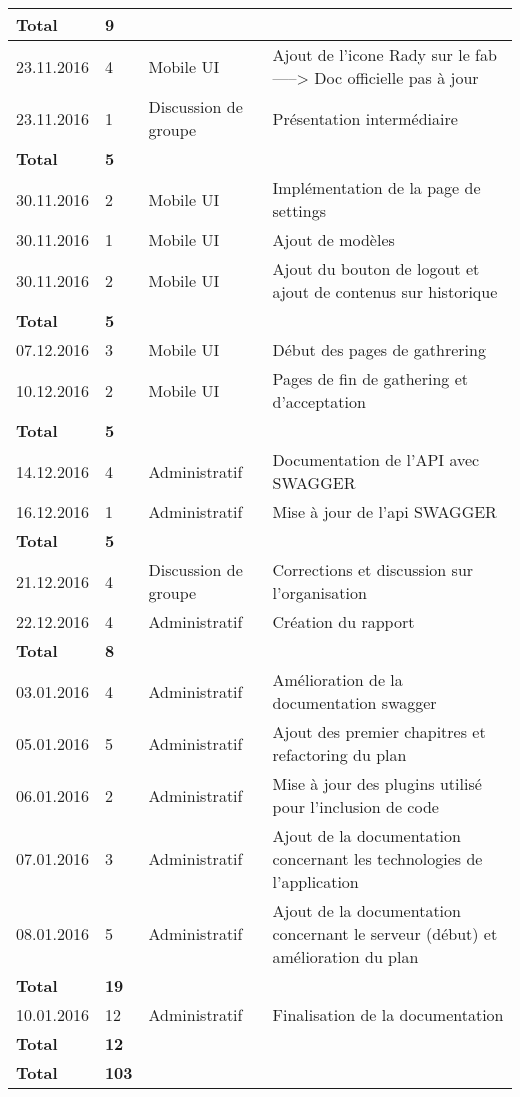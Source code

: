 \documentclass[french]{article}
\begin{document}
\begin{longtable}{p{}|p{}|p{}|p{}}
		\textbf{Total} & \textbf{9} &&\\
		\hline
		23.11.2016 & 4 & Mobile UI & Ajout de l'icone Rady sur le fab -----> Doc officielle pas à jour\\
		23.11.2016 & 1 & Discussion de groupe & Présentation intermédiaire\\
		\textbf{Total} & \textbf{5} &&\\
		\hline
		30.11.2016 & 2 & Mobile UI & Implémentation de la page de settings\\
		30.11.2016 & 1 & Mobile UI & Ajout de modèles\\
		30.11.2016 & 2 & Mobile UI & Ajout du bouton de logout et ajout de contenus sur historique\\
		\textbf{Total} & \textbf{5} &&\\
		\hline
		07.12.2016 & 3 & Mobile UI & Début des pages de gathrering\\
		10.12.2016 & 2 & Mobile UI & Pages de fin de gathering et d'acceptation\\
		\textbf{Total} & \textbf{5} &&\\
		\hline
		14.12.2016 & 4 & Administratif & Documentation de l'API avec SWAGGER\\
		16.12.2016 & 1 & Administratif & Mise à jour de l'api SWAGGER\\
		\textbf{Total} & \textbf{5} &&\\
		\hline
		21.12.2016 & 4 & Discussion de groupe & Corrections et discussion sur l'organisation\\
		22.12.2016 & 4 & Administratif & Création du rapport\\
		\textbf{Total} & \textbf{8} &&\\
		\hline
		03.01.2016 & 4 & Administratif & Amélioration de la documentation swagger\\
		05.01.2016 & 5 & Administratif & Ajout des premier chapitres et refactoring du plan\\
		06.01.2016 & 2 & Administratif & Mise à jour des plugins utilisé pour l'inclusion de code \\
		07.01.2016 & 3 & Administratif & Ajout de la documentation concernant les technologies de l'application\\
		08.01.2016 & 5 & Administratif & Ajout de la documentation concernant le serveur (début) et amélioration du plan\\
		\textbf{Total} & \textbf{19} &&\\
		\hline
		10.01.2016 & 12 & Administratif & Finalisation de la documentation\\
		\textbf{Total} & \textbf{12} &&\\
		\hline\hline
		\textbf{Total} & \textbf{103} &&\\
	\end{longtable}
\end{document}
